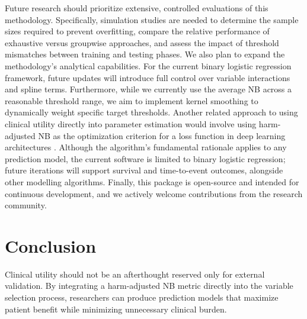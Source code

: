 Future research should prioritize extensive, controlled evaluations of this methodology. Specifically, simulation studies are needed to determine the sample sizes required to prevent overfitting, compare the relative performance of exhaustive versus groupwise approaches, and assess the impact of threshold mismatches between training and testing phases. We also plan to expand the methodology's analytical capabilities. For the current binary logistic regression framework, future updates will introduce full control over variable interactions and spline terms. Furthermore, while we currently use the average \gls{NB} across a reasonable threshold range, we aim to implement kernel smoothing to dynamically weight specific target thresholds. Another related approach to using clinical utility directly into parameter estimation would involve using harm-adjusted \gls{NB} as the optimization criterion for a loss function in deep learning architectures \cite{vickersHypothesisNetBenefit2025}. Although the algorithm's fundamental rationale applies to any prediction model, the current software is limited to binary logistic regression; future iterations will support survival and time-to-event outcomes, alongside other modelling algorithms. Finally, this package is open-source and intended for continuous development, and we actively welcome contributions from the research community.

\section{Conclusion}

Clinical utility should not be an afterthought reserved only for external validation. By integrating a harm-adjusted \gls{NB} metric directly into the variable selection process, researchers can produce prediction models that maximize patient benefit while minimizing unnecessary clinical burden.

